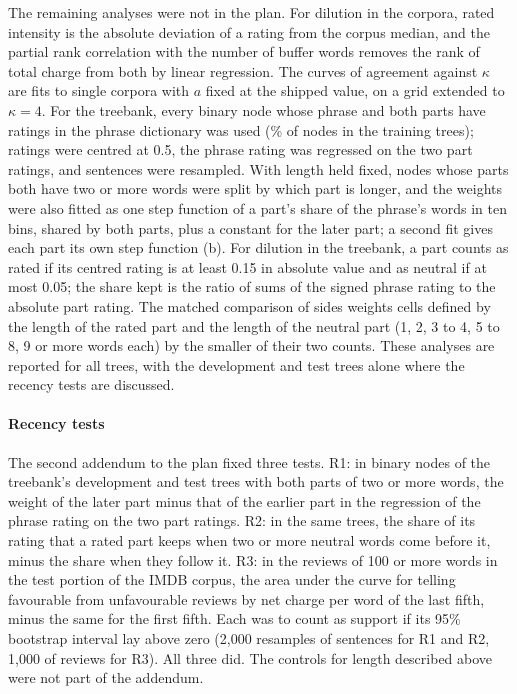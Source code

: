 The remaining analyses were not in the plan. For dilution in the corpora, rated intensity is the absolute deviation of a rating from the corpus median, and the partial rank correlation with the number of buffer words removes the rank of total charge from both by linear regression. The curves of agreement against $\kappa$ are fits to single corpora with $a$ fixed at the shipped value, on a grid extended to $\kappa=4$. For the treebank, every binary node whose phrase and both parts have ratings in the phrase dictionary was used (\treeMatch\% of nodes in the training trees); ratings were centred at 0.5, the phrase rating was regressed on the two part ratings, and sentences were resampled. With length held fixed, nodes whose parts both have two or more words were split by which part is longer, and the weights were also fitted as one step function of a part's share of the phrase's words in ten bins, shared by both parts, plus a constant for the later part; a second fit gives each part its own step function (b). For dilution in the treebank, a part counts as rated if its centred rating is at least 0.15 in absolute value and as neutral if at most 0.05; the share kept is the ratio of sums of the signed phrase rating to the absolute part rating. The matched comparison of sides weights cells defined by the length of the rated part and the length of the neutral part (1, 2, 3 to 4, 5 to 8, 9 or more words each) by the smaller of their two counts. These analyses are reported for all trees, with the development and test trees alone where the recency tests are discussed.

\paragraph{Recency tests}
The second addendum to the plan fixed three tests. R1: in binary nodes of the treebank's development and test trees with both parts of two or more words, the weight of the later part minus that of the earlier part in the regression of the phrase rating on the two part ratings. R2: in the same trees, the share of its rating that a rated part keeps when two or more neutral words come before it, minus the share when they follow it. R3: in the \confReviews{} reviews of 100 or more words in the test portion of the IMDB corpus\cite{maas2011}, the area under the curve for telling favourable from unfavourable reviews by net charge per word of the last fifth, minus the same for the first fifth. Each was to count as support if its 95\% bootstrap interval lay above zero (2,000 resamples of sentences for R1 and R2, 1,000 of reviews for R3). All three did. The controls for length described above were not part of the addendum.

